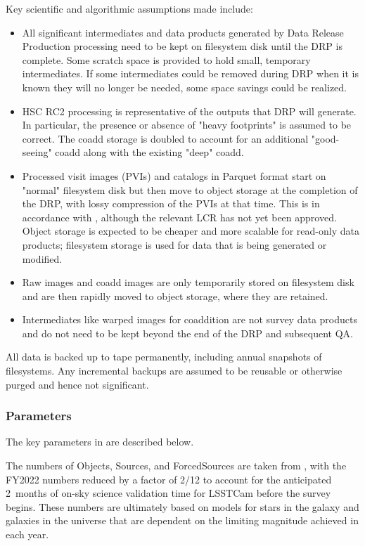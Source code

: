 Key scientific and algorithmic assumptions made include:
\begin{itemize}
\item All significant intermediates and data products generated by Data Release Production processing need to be kept on filesystem disk until the DRP is complete.
Some scratch space is provided to hold small, temporary intermediates.
If some intermediates could be removed during DRP when it is known they will no longer be needed, some space savings could be realized.
\item HSC RC2 processing is representative of the outputs that DRP will generate.
In particular, the presence or absence of "heavy footprints" is assumed to be correct.
The coadd storage is doubled to account for an additional "good-seeing" coadd along with the existing "deep" coadd.
\item Processed visit images (PVIs) and catalogs in Parquet format start on "normal" filesystem disk but then move to object storage at the completion of the DRP, with lossy compression of the PVIs at that time.
This is in accordance with , although the relevant LCR has not yet been approved.
Object storage is expected to be cheaper and more scalable for read-only data products; filesystem storage is used for data that is being generated or modified.
\item Raw images and coadd images are only temporarily stored on filesystem disk and are then rapidly moved to object storage, where they are retained.
\item Intermediates like warped images for coaddition are not survey data products and do not need to be kept beyond the end of the DRP and subsequent QA.
\end{itemize}

All data is backed up to tape permanently, including annual snapshots of filesystems.
Any incremental backups are assumed to be reusable or otherwise purged and hence not significant.

\subsubsection{Parameters}

The key parameters in  are described below.

The numbers of Objects, Sources, and ForcedSources are taken from , with the FY2022 numbers reduced by a factor of 2/12 to account for the anticipated 2~months of on-sky science validation time for LSSTCam before the survey begins.
These numbers are ultimately based on models for stars in the galaxy and galaxies in the universe that are dependent on the limiting magnitude achieved in each year.

